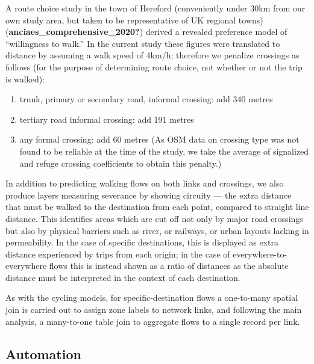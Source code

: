 \documentclass[galley]{jtlu-article-2col}
\providecommand{\tightlist}{%
  \setlength{\itemsep}{0pt}\setlength{\parskip}{0pt}}
\begin{document}
A route choice study in the town of Hereford (conveniently under 30km from our own study area, but taken to be representative of UK regional towns) (\textbf{anciaes\_comprehensive\_2020?}) derived a revealed preference model of ``willingness to walk.''
In the current study these figures were translated to distance by assuming a walk speed of 4km/h; therefore we penalize crossings as follows (for the purpose of determining route choice, not whether or not the trip is walked):

\begin{enumerate}
\def\labelenumi{\arabic{enumi}.}
\tightlist
\item
  trunk, primary or secondary road, informal crossing: add 340 metres
\item
  tertiary road informal crossing: add 191 metres
\item
  any formal crossing: add 60 metres (As OSM data on crossing type was not found to be reliable at the time of the study, we take the average of signalized and refuge crossing coefficients to obtain this penalty.)
\end{enumerate}

In addition to predicting walking flows on both links and crossings, we also produce layers measuring severance by showing circuity --- the extra distance that must be walked to the destination from each point, compared to straight line distance.
This identifies areas which are cut off not only by major road crossings but also by physical barriers such as river, or railways, or urban layouts lacking in permeability. In the case of specific destinations, this is displayed as extra distance experienced by trips from each origin; in the case of everywhere-to-everywhere flows this is instead shown as a ratio of distances as the absolute distance must be interpreted in the context of each destination.

As with the cycling models, for specific-destination flows a one-to-many spatial join is carried out to assign zone labels to network links, and following the main analysis, a many-to-one table join to aggregate flows to a single record per link.

\hypertarget{automation}{%
\subsection{Automation}\label{automation}}
\end{document}
